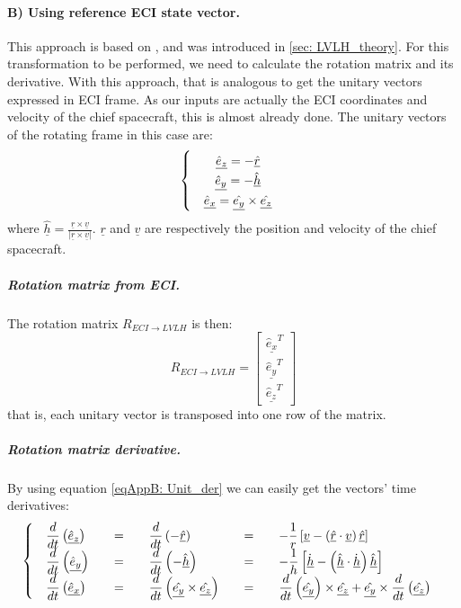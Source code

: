 		\paragraph{B) Using reference ECI state vector. \\}
		 \label{sec:	LVLH_example}
		\indent This approach is based on \cite{LVLH}, and was introduced in \ref{sec:	LVLH_theory}. For this transformation to be performed, we need to calculate the rotation matrix and its derivative. With this approach, that is analogous to get the unitary vectors expressed in ECI frame. As our inputs are actually the ECI coordinates and velocity of the chief spacecraft, this is almost already done. The unitary vectors of the rotating frame in this case are:
		\begin{equation}
		\arraycolsep=10pt
		\def\arraystretch{1.3}
		\left\{ \begin{array}{ccc}
		\underline{\hat{e}_z} = - \underline{\hat{r}} \\
		\underline{\hat{e}_y} = - \underline{\hat{h}} \\		
		\underline{\hat{e}_x} = \underline{\hat{e_y}} \times \underline{\hat{e_z}} 		
		\end{array}\right.
		\end{equation}
		\noindent where $\underline{\hat{h}} = \frac{\underline{r} \times\underline{v}}{\lvert \underline{r} \times\underline{v} \rvert}$. $\underline{r}$ and $\underline{v}$ are respectively the position and velocity of the chief spacecraft.
			\subparagraph{Rotation matrix from ECI. \\}
			\indent The rotation matrix $R_{ECI\to LVLH}$ is then:
			\[
			R_{ECI\to LVLH}= \left[ \begin{array}{c}
			\underline{\hat{e}_x}^T \\
			\underline{\hat{e}_y}^T \\
			\underline{\hat{e}_z}^T
			\end{array}\right]
			\]
			\noindent that is, each unitary vector is transposed into one row of the matrix.
			\subparagraph{Rotation matrix derivative. \\}
			\indent By using equation \eqref{eqAppB:	Unit_der} we can easily get the vectors' time derivatives:
			\[
			\arraycolsep=10pt
			\def\arraystretch{1.3}
			\left\{ \begin{array}{lllll}
			\dfrac{d}{dt} \left(\underline{\hat{e}_z}\right) & = & \dfrac{d}{dt} \left(-\underline{\hat{r}}\right) & = & - \dfrac{1}{r} \left[ \underline{v} - \left(\underline{\hat{r}} \cdot \underline{v}\right)\underline{\hat{r}}\right] \\
			\dfrac{d}{dt} \left(\underline{\hat{e}_y}\right) & = & \dfrac{d}{dt} \left(-\underline{\hat{h}}\right) & = & - \dfrac{1}{h} \left[ \underline{\dot{h}} - \left(\underline{\hat{h}} \cdot \underline{\dot{h}}\right)\underline{\hat{h}}\right] \\
			\dfrac{d}{dt} \left(\underline{\hat{e}_x}\right)  & = & \dfrac{d}{dt} \left(\underline{\hat{e_y}}\times \underline{\hat{e_z}}\right) & = & \dfrac{d}{dt} \left(\underline{\hat{e_y}}\right)\times\underline{\hat{e_z}} +  \underline{\hat{e_y}}\times \dfrac{d}{dt} \left(\underline{\hat{e_z}}\right)
			\end{array} \right.
			\]
